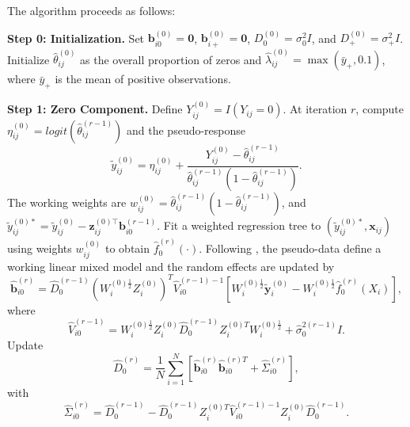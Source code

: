 \documentclass[twoside]{article}
\begin{document}
\begin{alg}
	The algorithm proceeds as follows:

	\textbf{Step 0: Initialization.}
	Set $\mathbf b_{i0}^{(0)}=\mathbf 0$, $\mathbf b_{i+}^{(0)}=\mathbf 0$,
	$D_0^{(0)}=\sigma_0^2I$, and $D_+^{(0)}=\sigma_+^2I$.
	Initialize $\hat\theta_{ij}^{(0)}$ as the overall proportion of zeros and
	$\hat\lambda_{ij}^{(0)}=\max(\bar y_+,0.1)$, where $\bar y_+$ is the mean of positive observations.
	
	\textbf{Step 1: Zero Component.}
	Define $Y_{ij}^{(0)}=I(Y_{ij}=0)$.
	At iteration $r$, compute
	$
	\eta_{ij}^{(0)}
	=
	logit\left({\hat\theta_{ij}^{(r-1)}}\right)$
	and the pseudo-response
	\begin{equation*}
		\tilde y_{ij}^{(0)}
		=
		\eta_{ij}^{(0)}
		+
		\frac
		{Y_{ij}^{(0)}-\hat\theta_{ij}^{(r-1)}}
		{\hat\theta_{ij}^{(r-1)}
			\left(1-\hat\theta_{ij}^{(r-1)}\right)}.
	\end{equation*}
	The working weights are
	$
	w_{ij}^{(0)}
	=
	\hat\theta_{ij}^{(r-1)}
	\left(1-\hat\theta_{ij}^{(r-1)}\right)
	$,
	and
	$
	\tilde y_{ij}^{(0)*}
	=
	\tilde y_{ij}^{(0)}
	-
	\mathbf z_{ij}^{(0)\top}\mathbf b_{i0}^{(r-1)}
	$.
	Fit a weighted regression tree to
	$(\tilde y_{ij}^{(0)*},\mathbf x_{ij})$
	using weights $w_{ij}^{(0)}$ to obtain $\hat f_0^{(r)}(\cdot)$.
	Following \cite{HLB17}, the pseudo-data define a working linear mixed model and the random effects are updated by
	\begin{equation*}
		\hat{\mathbf b}_{i0}^{(r)}
		=
		\hat D_0^{(r-1)}
		\left(
		W_i^{(0)\frac12}Z_i^{(0)}
		\right)^T
		\hat V_{i0}^{(r-1)-1}
		\left[
		W_i^{(0)\frac12}\tilde{\mathbf y}_i^{(0)}
		-
		W_i^{(0)\frac12}\hat f_0^{(r)}(X_i)
		\right],
	\end{equation*}
	where
	\begin{equation*}
		\hat V_{i0}^{(r-1)}
		=
		W_i^{(0)\frac12}
		Z_i^{(0)}
		\hat D_0^{(r-1)}
		Z_i^{(0)T}
		W_i^{(0)\frac12}
		+
		\hat\sigma_0^{2(r-1)}I .
	\end{equation*}
	Update
	\begin{equation*}
		\hat D_0^{(r)}
		=
		\frac{1}{N}
		\sum_{i=1}^{N}
		\left[
		\hat{\mathbf b}_{i0}^{(r)}
		\hat{\mathbf b}_{i0}^{(r)T}
		+
		\hat\Sigma_{i0}^{(r)}
		\right],
	\end{equation*}
	with
	\begin{equation*}
		\hat\Sigma_{i0}^{(r)}
		=
		\hat D_0^{(r-1)}
		-
		\hat D_0^{(r-1)}
		Z_i^{(0)T}
		\hat V_{i0}^{(r-1)-1}
		Z_i^{(0)}
		\hat D_0^{(r-1)} .
	\end{equation*}

\end{alg}
\end{document}
